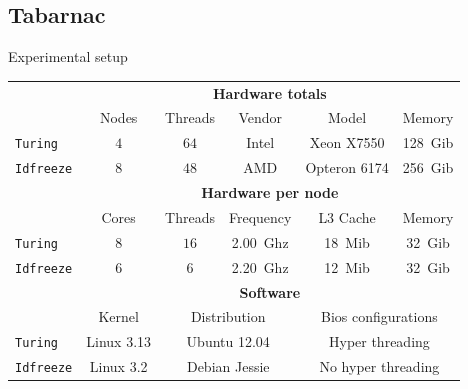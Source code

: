 \documentclass[xcolor={usenames,dvipsnames},hyperref={pdfusetitle}]{beamer}
\begin{document}
\subsection*{Tabarnac}

\setcounter{framenumber}{\value{finalframe}}
\begin{frame}{Experimental setup}
    \small
    \centering
    \begin{tabular}{lccccc}
        \toprule
        & \multicolumn{5}{c}{\textbf{Hardware totals}}\\
        \cmidrule(lr){2-6}
        & Nodes & Threads & Vendor & Model & Memory \\
        \cmidrule(lr){2-6}
        \texttt{Turing}   & $4$ & $64$ & Intel & Xeon X7550   & \SI{128}{Gib} \\
        \texttt{Idfreeze} & $8$ & $48$ & AMD   & Opteron 6174 & \SI{256}{Gib}\\
        \midrule
        & \multicolumn{5}{c}{\textbf{Hardware per node}}\\
        \cmidrule(lr){2-6}
        & Cores & Threads & Frequency & L3 Cache & Memory \\
        \cmidrule(lr){2-6}
        \texttt{Turing}   & $8$ & $16$ & \SI{2.00}{Ghz}& \SI{18}{Mib} & \SI{32}{Gib} \\
        \texttt{Idfreeze} & $6$ & $6$  & \SI{2.20}{Ghz}& \SI{12}{Mib} & \SI{32}{Gib}\\
        \midrule
        & \multicolumn{5}{c}{\textbf{Software}}\\
        \cmidrule(lr){2-6}
        & Kernel & \multicolumn{2}{c}{Distribution} &
        \multicolumn{2}{c}{Bios configurations} \\
        \cmidrule(lr){2-6}
        \texttt{Turing}   & Linux 3.13 & \multicolumn{2}{c}{Ubuntu 12.04} &
        \multicolumn{2}{c}{Hyper threading} \\
        \texttt{Idfreeze} & Linux 3.2 & \multicolumn{2}{c}{Debian Jessie} &
        \multicolumn{2}{c}{No hyper threading}\\
        \bottomrule
    \end{tabular}
\end{frame}
\end{document}
